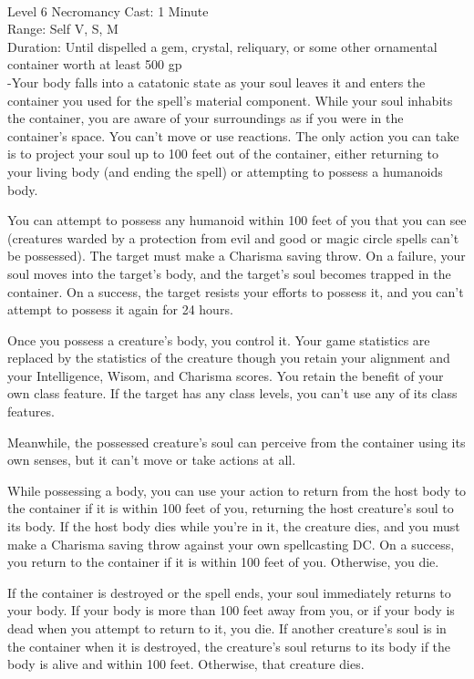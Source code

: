 \documentclass[10pt,twocolumn]{report}
\begin{document}
 \\
Level 6 \quad Necromancy \quad Cast: 1 Minute\\
Range: Self \quad V, S, M\\
Duration: Until dispelled \quad a gem, crystal, reliquary, or some other ornamental container worth at least 500 gp\\
-Your body falls into a catatonic state as your soul leaves it and enters the container you used for the spell’s material component. While your soul inhabits the container, you are aware of your surroundings as if you were in the container’s space. You can’t move or use reactions. The only action you can take is to project your soul up to 100 feet out of the container, either returning to your living body (and ending the spell) or attempting to possess a humanoids body.

You can attempt to possess any humanoid within 100 feet of you that you can see (creatures warded by a protection from evil and good or magic circle spells can’t be possessed). The target must make a Charisma saving throw. On a failure, your soul moves into the target’s body, and the target’s soul becomes trapped in the container. On a success, the target resists your efforts to possess it, and you can’t attempt to possess it again for 24 hours.

Once you possess a creature’s body, you control it. Your game statistics are replaced by the statistics of the creature though you retain your alignment and your Intelligence, Wisom, and Charisma scores. You retain the benefit of your own class feature. If the target has any class levels, you can’t use any of its class features.

Meanwhile, the possessed creature’s soul can perceive from the container using its own senses, but it can’t move or take actions at all.

While possessing a body, you can use your action to return from the host body to the container if it is within 100 feet of you, returning the host creature’s soul to its body. If the host body dies while you’re in it, the creature dies, and you must make a Charisma saving throw against your own spellcasting DC. On a success, you return to the container if it is within 100 feet of you. Otherwise, you die.

If the container is destroyed or the spell ends, your soul immediately returns to your body. If your body is more than 100 feet away from you, or if your body is dead when you attempt to return to it, you die. If another creature’s soul is in the container when it is destroyed, the creature’s soul returns to its body if the body is alive and within 100 feet. Otherwise, that creature dies.
\end{document}
